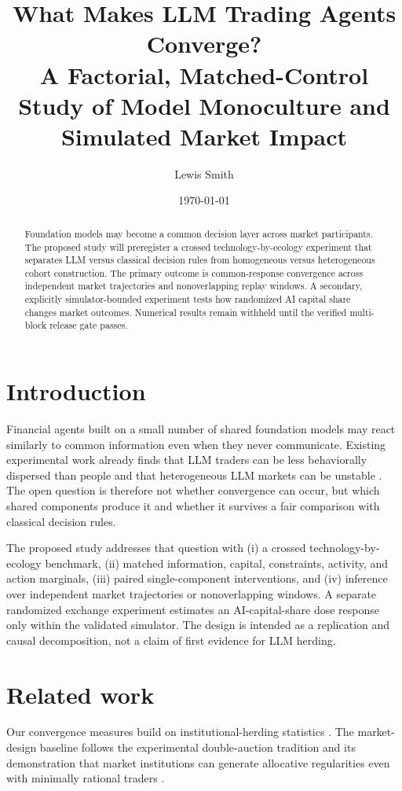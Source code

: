\documentclass[11pt]{article}
\title{What Makes LLM Trading Agents Converge?\\
\large A Factorial, Matched-Control Study of Model Monoculture and
Simulated Market Impact}
\author{Lewis Smith}
\date{\today}
\begin{document}
\maketitle

\begin{abstract}
Foundation models may become a common decision layer across market
participants. The proposed study will preregister a crossed
technology-by-ecology experiment that separates LLM versus classical decision
rules from homogeneous versus heterogeneous cohort construction. The primary
outcome is common-response convergence across independent market trajectories
and nonoverlapping replay windows. A secondary, explicitly simulator-bounded
experiment tests how randomized AI capital share changes market outcomes.
Numerical results remain withheld until the verified multi-block release gate
passes.
\end{abstract}

\section{Introduction}
Financial agents built on a small number of shared foundation models may react
similarly to common information even when they never communicate. Existing
experimental work already finds that LLM traders can be less behaviorally
dispersed than people and that heterogeneous LLM markets can be unstable
\citep{henning2025llm,saxena2026machine}. The open question is therefore not
whether convergence can occur, but which shared components produce it and
whether it survives a fair comparison with classical decision rules.

The proposed study addresses that question with (i) a crossed
technology-by-ecology benchmark, (ii) matched information, capital, constraints,
activity, and action marginals, (iii) paired single-component interventions,
and (iv) inference over independent market trajectories or nonoverlapping
windows. A separate randomized exchange experiment estimates an AI-capital-share
dose response only within the validated simulator. The design is intended as a
replication and causal decomposition, not a claim of first evidence for LLM
herding.

\section{Related work}
Our convergence measures build on institutional-herding statistics
\citep{lakonishok1992impact,sias2004institutional}. The market-design baseline
follows the experimental double-auction tradition and its demonstration that
market institutions can generate allocative regularities even with minimally
rational traders \citep{smith1962experimental,gode1993allocative}.
\end{document}
